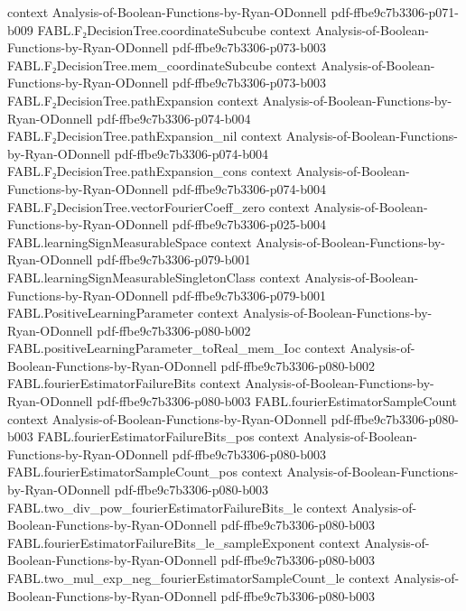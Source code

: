 \begin{theorem}
  {context}
  {Analysis-of-Boolean-Functions-by-Ryan-ODonnell}
  {pdf-ffbe9c7b3306-p071-b009}
\proofstep
  {FABL.F₂DecisionTree.coordinateSubcube}
  {context}
  {Analysis-of-Boolean-Functions-by-Ryan-ODonnell}
  {pdf-ffbe9c7b3306-p073-b003}
\proofstep
  {FABL.F₂DecisionTree.mem_coordinateSubcube}
  {context}
  {Analysis-of-Boolean-Functions-by-Ryan-ODonnell}
  {pdf-ffbe9c7b3306-p073-b003}
\proofstep
  {FABL.F₂DecisionTree.pathExpansion}
  {context}
  {Analysis-of-Boolean-Functions-by-Ryan-ODonnell}
  {pdf-ffbe9c7b3306-p074-b004}
\proofstep
  {FABL.F₂DecisionTree.pathExpansion_nil}
  {context}
  {Analysis-of-Boolean-Functions-by-Ryan-ODonnell}
  {pdf-ffbe9c7b3306-p074-b004}
\proofstep
  {FABL.F₂DecisionTree.pathExpansion_cons}
  {context}
  {Analysis-of-Boolean-Functions-by-Ryan-ODonnell}
  {pdf-ffbe9c7b3306-p074-b004}
\proofstep
  {FABL.F₂DecisionTree.vectorFourierCoeff_zero}
  {context}
  {Analysis-of-Boolean-Functions-by-Ryan-ODonnell}
  {pdf-ffbe9c7b3306-p025-b004}
\proofstep
  {FABL.learningSignMeasurableSpace}
  {context}
  {Analysis-of-Boolean-Functions-by-Ryan-ODonnell}
  {pdf-ffbe9c7b3306-p079-b001}
\proofstep
  {FABL.learningSignMeasurableSingletonClass}
  {context}
  {Analysis-of-Boolean-Functions-by-Ryan-ODonnell}
  {pdf-ffbe9c7b3306-p079-b001}
\proofstep
  {FABL.PositiveLearningParameter}
  {context}
  {Analysis-of-Boolean-Functions-by-Ryan-ODonnell}
  {pdf-ffbe9c7b3306-p080-b002}
\proofstep
  {FABL.positiveLearningParameter_toReal_mem_Ioc}
  {context}
  {Analysis-of-Boolean-Functions-by-Ryan-ODonnell}
  {pdf-ffbe9c7b3306-p080-b002}
\proofstep
  {FABL.fourierEstimatorFailureBits}
  {context}
  {Analysis-of-Boolean-Functions-by-Ryan-ODonnell}
  {pdf-ffbe9c7b3306-p080-b003}
\proofstep
  {FABL.fourierEstimatorSampleCount}
  {context}
  {Analysis-of-Boolean-Functions-by-Ryan-ODonnell}
  {pdf-ffbe9c7b3306-p080-b003}
\proofstep
  {FABL.fourierEstimatorFailureBits_pos}
  {context}
  {Analysis-of-Boolean-Functions-by-Ryan-ODonnell}
  {pdf-ffbe9c7b3306-p080-b003}
\proofstep
  {FABL.fourierEstimatorSampleCount_pos}
  {context}
  {Analysis-of-Boolean-Functions-by-Ryan-ODonnell}
  {pdf-ffbe9c7b3306-p080-b003}
\proofstep
  {FABL.two_div_pow_fourierEstimatorFailureBits_le}
  {context}
  {Analysis-of-Boolean-Functions-by-Ryan-ODonnell}
  {pdf-ffbe9c7b3306-p080-b003}
\proofstep
  {FABL.fourierEstimatorFailureBits_le_sampleExponent}
  {context}
  {Analysis-of-Boolean-Functions-by-Ryan-ODonnell}
  {pdf-ffbe9c7b3306-p080-b003}
\proofstep
  {FABL.two_mul_exp_neg_fourierEstimatorSampleCount_le}
  {context}
  {Analysis-of-Boolean-Functions-by-Ryan-ODonnell}
  {pdf-ffbe9c7b3306-p080-b003}

\end{theorem}
